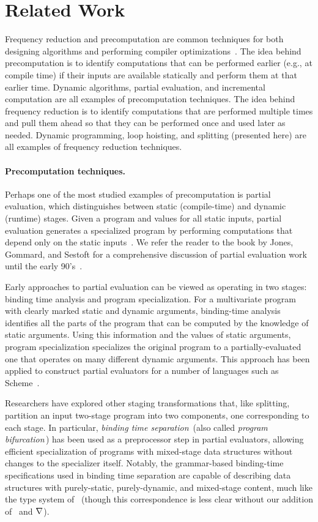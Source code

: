 
\section{Related Work}
\label{sec:related}

Frequency reduction and precomputation are common techniques for both
designing algorithms and performing compiler
optimizations~\cite{JS86-staging}.
%
The idea behind precomputation is to identify computations that can be
performed earlier (e.g., at compile time) if their inputs are
available statically and perform them at that earlier time. Dynamic
algorithms, partial evaluation, and incremental computation are all
examples of precomputation techniques.
%
The idea behind frequency reduction is to identify computations that
are performed multiple times and pull them ahead so that they can be
performed once and used later as needed.  Dynamic programming, loop
hoisting, and splitting (presented here) are all examples of frequency
reduction techniques.

\paragraph{Precomputation techniques.}
Perhaps one of the most studied examples of precomputation is partial
evaluation, which distinguishes between static (compile-time) and
dynamic (runtime) stages. Given a program and values for all static
inputs, partial evaluation generates a specialized program by
performing computations that depend only on the static
inputs~\cite{jones96}.  
We refer the reader to the book by Jones, Gommard, and Sestoft for
a comprehensive discussion of partial evaluation work until the early
90's~\cite{JGS93}.

Early approaches to partial evaluation can be viewed as operating in
two stages: binding time analysis and program specialization.  For a
multivariate program with clearly marked static and dynamic arguments,
binding-time analysis identifies all the parts of the program that can
be computed by the knowledge of static arguments. Using this
information and the values of static arguments, program specialization
specializes the original program to a partially-evaluated one that
operates on many different dynamic arguments.  This approach has been
applied to construct partial evaluators for a number of languages such
as Scheme~\cite{OB91-Similix,Consel88-Schism}.

Researchers have explored other staging transformations that, 
like splitting, partition an input two-stage program into two components,
one corresponding to each stage.  
In particular, \emph{binding time separation}\,\cite{Mogensen89a} 
(also called \emph{program bifurcation}\,\cite{DeNiel91})
has been used as a preprocessor step in partial evaluators,
allowing efficient specialization of programs with 
mixed-stage data structures without changes to the specializer itself.
Notably, the grammar-based binding-time specifications used in binding 
time separation are capable of describing
data structures with purely-static, purely-dynamic, and mixed-stage
content, much like the type system of \lang\
(though this correspondence is less clear without our addition of 
\bbonep\ and $\nabla$).

